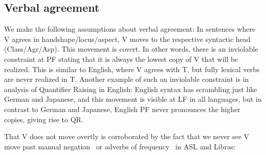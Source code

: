 \documentclass[output=paper]{langscibook}
\begin{document}
\subsection{Verbal agreement}
\label{lasz:sec:22}

We make the following assumptions about verbal agreement:
In sentences where V agrees in handshape/locus/aspect, V
moves to the respective syntactic head (Class/Agr/Asp). This movement
is covert. In other words, there is an inviolable constraint at PF stating
that it is always the lowest copy of V that will be realized. This is
similar to English, where V agrees with T, but fully lexical verbs are
never realized in T. Another example of such an inviolable constraint
is in  analysis of Quantifier Raising in
English: English syntax has scrambling just like German and
Japanese, and this movement is visible at LF in all languages, but in
contrast to German and Japanese, English PF never pronounces the
higher copies, giving rise to QR.

That V does not move overtly is corroborated by the fact that
we never see V move past manual negation~ or adverbs of
frequency~ in ASL and Libras:

\ea
    \label{lasz:ex:8}
    \z 
\ex 
    \label{lasz:ex:9}
    \z
\z 
\end{document}

